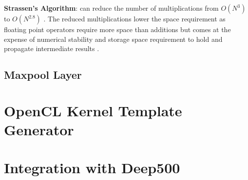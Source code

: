 \textbf{Strassen's Algorithm}\cite{cong2014minimizing}: can reduce the number of multiplications from $O(N^3)$ to $O(N^{2.8})$\cite{sze2017efficient} . The reduced multiplications lower the space requirement as floating point operators require more space than additions but comes at the expense of numerical stability and storage space requirement to hold and propagate intermediate results \cite{sze2017efficient}.

\subsection{Maxpool Layer}


\section{OpenCL Kernel Template Generator}

\section{Integration with Deep500}